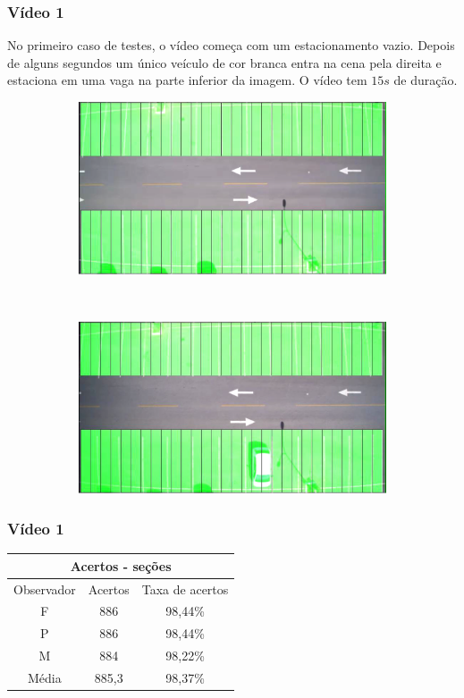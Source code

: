 \documentclass{beamer}
\begin{document}
\begin{frame}
\frametitle{Vídeo 1}

No primeiro caso de testes, o vídeo começa com um estacionamento vazio. Depois de alguns segundos um único veículo de cor branca entra na cena pela direita e estaciona em uma vaga na parte inferior da imagem. O vídeo tem $15s$ de duração.

\begin{figure}
\centering
\begin{subfigure}{.5\textwidth}
\centering
\includegraphics[width=.5\linewidth]{Video1Inicio}
\end{subfigure}\
\begin{subfigure}{.5\textwidth}
\centering
\includegraphics[width=.5\linewidth]{Video1Fim}
\end{subfigure}
\centering
\end{figure}	
\end{frame}

\begin{frame}
	\frametitle{Vídeo 1}
	
	\begin{center}
\begin{tabular}{|c||c||c|}
\hline
\multicolumn{3}{|c|}{Acertos - seções}  \\ \hline \hline
Observador & Acertos& Taxa de acertos \\ \hline
F & 886 & 98,44\% \\  \hline
P & 886 & 98,44\% \\ \hline
M & 884 & 98,22\% \\ \hline
Média & 885,3 & 98,37\% \\
\hline
\end{tabular}
\end{center}
\end{frame}
\end{document}
